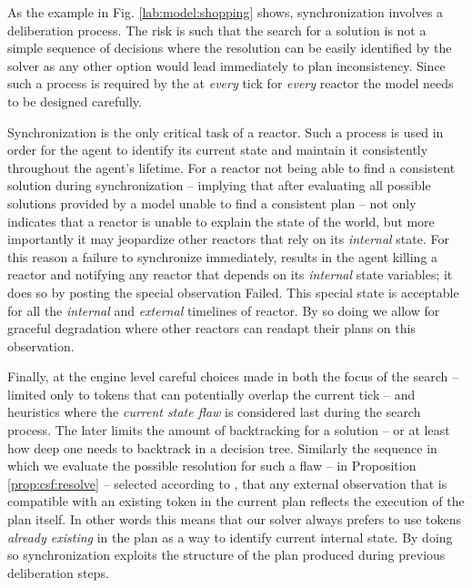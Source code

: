 As the example in Fig. \ref{lab:model:shopping} shows, synchronization
involves a deliberation process. The risk is such that the search for
a solution is not a simple sequence of decisions where the resolution
can be easily identified by the solver as any other option would lead
immediately to plan inconsistency. Since such a process is required by
the \rx at \emph{every} tick for \emph{every} reactor the model needs
to be designed carefully.

Synchronization is the only critical task of a reactor. Such a process
is used in order for the agent to identify its current state and
maintain it consistently throughout the agent's lifetime. For a
reactor not being able to find a consistent solution during
synchronization -- implying that after evaluating all possible
solutions provided by a model  unable to find a
consistent plan -- not only indicates that a reactor is unable to
explain the state of the world, but more importantly it may jeopardize
other reactors that rely on its {\em internal} state. For this reason
a failure to synchronize immediately, results in the \rx agent killing
a reactor and notifying any reactor that depends on its {\em internal}
state variables; it does so by posting the special observation
\textsf{Failed}. This special state is acceptable for all the {\em
  internal} and {\em external} timelines of  \eu reactor.
By so doing we allow for graceful degradation where other reactors can
readapt their plans on  this observation.

Finally, at the engine level careful choices  made in
both the focus of the search -- limited only to tokens that can
potentially overlap the current tick -- and heuristics where the {\em
  current state flaw} is considered last during the search
process. The later limits the amount of backtracking for a solution --
or at least how deep one needs to backtrack in a decision tree.
Similarly the sequence in which we evaluate the possible resolution
for such a flaw --  in Proposition
\ref{prop:csf:resolve} --  selected according to
, that any external observation that is
compatible with an existing token in the current plan reflects the
execution of the plan itself. In other words this means that our
solver always prefers to use tokens \emph{already existing} in the
plan as a way to identify current internal state. By doing so
synchronization exploits the structure of the plan produced during
previous deliberation steps.

